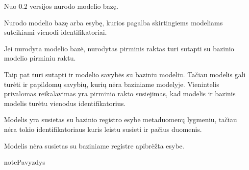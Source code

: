 \documentclass[letterpaper,10pt,lithuanian]{sphinxmanual}
\begin{document}
\begin{fulllineitems}
\label{\detokenize{dimensijos:model.type}}
\pysigstartsignatures
\pysigline
{}
\pysigstopsignatures
\sphinxAtStartPar
{}Nuo 0.2 versijos nurodo modelio bazę.

\sphinxAtStartPar
Nurodo modelio bazę arba esybę, kurios pagalba skirtingiems modeliams
suteikiami vienodi identifikatoriai.

\sphinxAtStartPar
Jei nurodyta modelio bazė, {\hyperref[\detokenize{dimensijos:model.ref}]{}} nurodytas pirminis raktas turi
sutapti su bazinio modelio pirminiu raktu.

\sphinxAtStartPar
Taip pat turi sutapti ir modelio savybės su baziniu modeliu. Tačiau modelis
gali turėti ir papildomų savybių, kurių nėra baziniame modelyje.
Vienintelis privalomas reikalavimas yra pirminio rakto susiejimas, kad
modelis ir bazinis modelis turėtu vienodus identifikatorius.

\begin{sphinxtopic}
\begin{description}
\sphinxAtStartPar
Modelis yra susietas su bazinio registro esybe metaduomenų
lygmeniu, tačiau nėra tokio identifikatoriaus kuris leistu susieti
ir pačius duomenis.

\sphinxAtStartPar
Modelis nėra susietas su baziniame registre apibrėžta esybe.

\end{description}
\end{sphinxtopic}

\begin{sphinxadmonition}{note}{Pavyzdys}

\sphinxAtStartPar
{}

\begin{DUlineblock}{0em}
\item[] 
\end{DUlineblock}

\sphinxAtStartPar
{}



\end{sphinxadmonition}
\end{fulllineitems}
\end{document}
